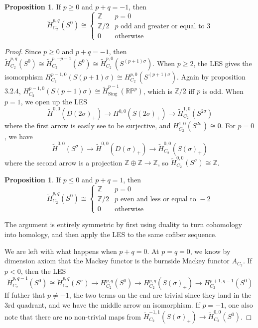 \documentclass{article}
\theoremstyle{definition}
\newtheorem{proposition}[theorem]{Proposition}
\begin{document}
\begin{tcolorbox}[colback=blue!5!white,colframe=blue!30!white]
\begin{proposition}
 If $p\geq 0$ and $p+q=-1$, then 
 \[\tilde{H}^{p,q}_{C_2}(S^0)\cong \begin{cases}
    \mathbb{Z} & p=0\\
    \mathbb{Z}/2 & p \textrm{ odd and greater or equal to }3  \\
    0 & \textrm{otherwise}
 \end{cases}\]
\end{proposition}
\end{tcolorbox}
\begin{proof}
    Since $p\geq 0$ and $p+q=-1$, then $\tilde{H}^{p,q}_{C_2}(S^0)\cong \tilde{H}^{p,-p-1}_{C_2}(S^0)\cong \tilde{H}^{p,0}_{C_2}(S^{(p+1)\sigma})$. When $p\geq 2$, the LES gives the isomorphism $H_{C_2}^{p-1,0}(S(p+1)\sigma)\cong H_{C_2}^{p,0}(S^{(p+1)\sigma})$. Again by proposition $3.2.4$, $H_{C_2}^{p-1,0}(S(p+1)\sigma)\cong \tilde{H}^{p-1}_{\textrm{Sing}}(\mathbb{RP}^p)$, which is $\mathbb{Z}/2$ iff $p$ is odd. When $p=1$, we open up the LES
    \[\tilde{H}^{0,0}(D(2\sigma)_+)\to H^{0,0}(S(2\sigma)_+)\to \tilde{H}^{1,0}_{C_2}(S^{2\sigma})\]
    where the first arrow is easily see to be surjective, and $H^{1,0}_{C_2}(S^{2\sigma})\cong 0$. For $p=0$, we have 
     \[\tilde{H}^{0,0}(S^\sigma)\to \tilde{H}^{0,0}(D(\sigma)_+)\to \tilde{H}^{0,0}_{C_2}(S({\sigma})_+)\]
    where the second arrow is a projection $\mathbb{Z}\oplus \mathbb{Z}\to \mathbb{Z}$, so $\tilde{H}^{0,0}_{C_2}(S^{\sigma})\cong \mathbb{Z}$. 

    \begin{tcolorbox}[colback=blue!5!white,colframe=blue!30!white]
        \begin{proposition}
         If $p\leq 0$ and $p+q=1$, then 
         \[\tilde{H}^{p,q}_{C_2}(S^0)\cong \begin{cases}
            \mathbb{Z} & p=0\\
            \mathbb{Z}/2 & p \textrm{ even and less or equal to }-2  \\
            0 & \textrm{otherwise}
         \end{cases}\]
        \end{proposition}
        \end{tcolorbox}
The argument is entirely symmetric by first using duality to turn cohomology into homology, and then apply the LES to the same cofiber sequence. 

We are left with what happens when $p+q=0$. At $p=q=0$, we know by dimension axiom that the Mackey functor is the burnside Mackey functor $A_{C_2}$. If $p<0$, then the LES 
\[\tilde{H}_{C_2}^{p,q-1}(S^0)\cong \tilde{H}_{C_2}^{p,q}(S^{\sigma})\to H_{C_2}^{p,q}(S^0)\to H_{C_2}^{p,q}(S(\sigma)_+)\to H_{C_2}^{p+1,q-1}(S^0) \]
If futher that $p\neq -1$, the two terms on the end are trivial since they land in the 3rd quadrant, and we have the middle arrow an isomorphism. If $p=-1$, one also note that there are no non-trivial maps from $\tilde{H}_{C_2}^{-1,1}(S(\sigma)_+)\to \tilde{H}_{C_2}^{0,0}(S^0)$. 
\end{proof} 
\end{document}

